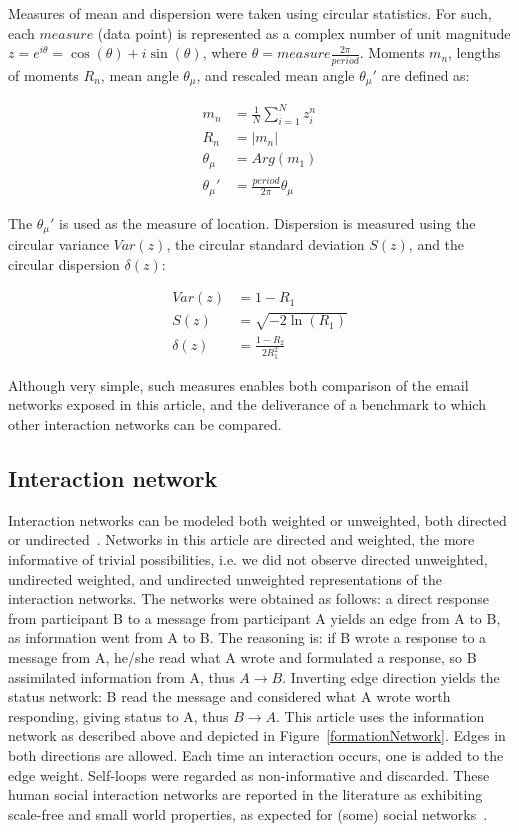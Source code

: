 \documentclass[%
 aip,
 jmp,%
 amsmath,amssymb,
 reprint,%
]{revtex4-1}
\begin{document}
  Measures of mean and dispersion were taken using circular statistics. For such, each $measure$ (data point) is represented as a complex number of unit magnitude $z=e^{i\theta}=\cos(\theta)+i\sin(\theta)$, where $\theta=measure\frac{2\pi}{period}$. Moments $m_n$, lengths of moments $R_n$, mean angle $\theta_\mu$, and rescaled mean angle $\theta_\mu'$ are defined as:

\begin{align}\label{eq:cmom}
	m_n&=\frac{1}{N}\sum_{i=1}^N z_i^n \nonumber\\
	R_n&=|m_n|\\
	\theta_\mu&=Arg(m_1) \nonumber \\
	\theta_\mu'&=\frac{period}{2\pi} \theta_\mu \nonumber
\end{align}

The $\theta_\mu'$ is used as the measure of location. Dispersion is measured using the circular variance $Var(z)$, the circular standard deviation $S(z)$, and the circular dispersion $\delta(z)$:

\begin{align}\label{eq:cmd}
	Var(z)&=1 - R_1 \nonumber\\
	S(z)&= \sqrt{-2\ln(R_1)}\\
	\delta(z)&=\frac{1-R_2}{2 R_1^2} \nonumber
\end{align}

Although very simple, such measures enables both comparison of the email networks exposed in this article, and the deliverance of a benchmark to which other interaction networks can be compared.

\subsection{Interaction network}\label{intNet}
Interaction networks can be modeled both weighted or unweighted, both directed or undirected~\cite{bird,newmanCommunityDirected,newmanCommunity2013}.
Networks in this article are directed and weighted, the more informative of trivial possibilities, i.e. we did not observe directed unweighted, undirected weighted, and undirected unweighted representations of the interaction networks. 
The networks were obtained as follows: a direct response from participant B to a message from participant A yields an edge from A to B, as information went from A to B. The reasoning is: if B wrote a response to a message from A, he/she read what A wrote and formulated a response, so B assimilated information from A, thus $A \rightarrow B$. Inverting edge direction yields the status network: B read the message and considered what A wrote worth responding, giving status to A, thus $B\rightarrow A$. This article uses the information network as described above and depicted in Figure~\ref{formationNetwork}. Edges in both directions are allowed. Each time an interaction occurs, one is added to the edge weight. Self-loops were regarded as non-informative and discarded. These human social interaction networks are reported in the literature as exhibiting scale-free and small world properties, as expected for (some) social networks~\cite{bird,newmanBook}.
\end{document}
